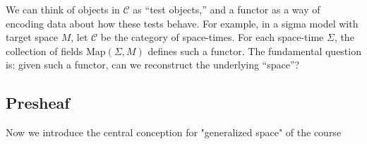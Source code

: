 \begin{remark}
We can think of objects in $\mathcal{C}$ as “test objects,” and a functor as a way of encoding data about how these tests behave. For example, in a sigma model with target space $M$, let $\mathcal{C}$ be the category of space-times. For each space-time $\Sigma$, the collection of fields $\mathrm{Map}(\Sigma, M)$ defines such a functor. The fundamental question is: given such a functor, can we reconstruct the underlying “space”?
\end{remark}

\subsection{Presheaf}
  
Now we introduce the central conception for "generalized space" of the course

